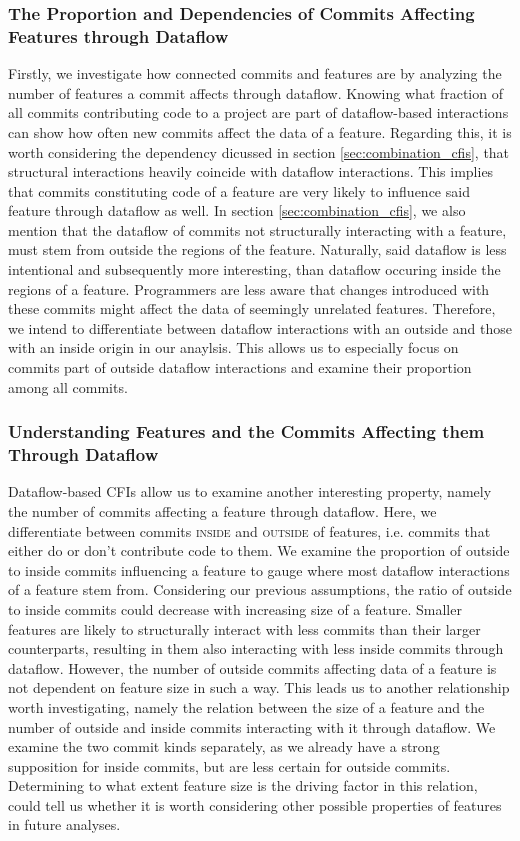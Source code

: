 \subsubsection*{The Proportion and Dependencies of Commits Affecting Features through Dataflow}

Firstly, we investigate how connected commits and features are by analyzing the number of features a commit affects through dataflow.
Knowing what fraction of all commits contributing code to a project are part of dataflow-based interactions can show how often new commits affect the data of a feature. 
Regarding this, it is worth considering the dependency dicussed in section \ref{sec:combination_cfis}, that structural interactions heavily coincide with dataflow interactions.
This implies that commits constituting code of a feature are very likely to influence said feature through dataflow as well.
In section \ref{sec:combination_cfis}, we also mention that the dataflow of commits not structurally interacting with a feature, must stem from outside the regions of the feature. 
Naturally, said dataflow is less intentional and subsequently more interesting, than dataflow occuring inside the regions of a feature. 
Programmers are less aware that changes introduced with these commits might affect the data of seemingly unrelated features.
Therefore, we intend to differentiate between dataflow interactions with an outside and those with an inside origin in our anaylsis.
This allows us to especially focus on commits part of outside dataflow interactions and examine their proportion among all commits. 

\subsubsection*{Understanding Features and the Commits Affecting them Through Dataflow}

Dataflow-based CFIs allow us to examine another interesting property, namely the number of commits affecting a feature through dataflow.
Here, we differentiate between commits \textsc{inside} and \textsc{outside} of features, i.e. commits that either do or don't contribute code to them.
We examine the proportion of outside to inside commits influencing a feature to gauge where most dataflow interactions of a feature stem from.
Considering our previous assumptions, the ratio of outside to inside commits could decrease with increasing size of a feature.
Smaller features are likely to structurally interact with less commits than their larger counterparts, resulting in them also interacting with less inside commits through dataflow.
However, the number of outside commits affecting data of a feature is not dependent on feature size in such a way.
This leads us to another relationship worth investigating, namely the relation between the size of a feature and the number of outside and inside commits interacting with it through dataflow.
We examine the two commit kinds separately, as we already have a strong supposition for inside commits, but are less certain for outside commits. 
Determining to what extent feature size is the driving factor in this relation, could tell us whether it is worth considering other possible properties of features in future analyses.

